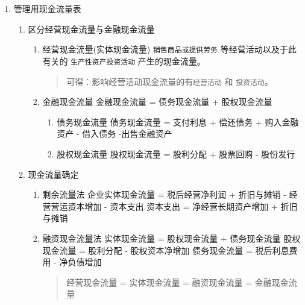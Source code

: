 \documentclass[11pt]{article}
\begin{document}
\begin{enumerate}
\begin{enumerate}
\label{sec:orgdb8c8f3}
利息费用 = -金融损益 = 财务费用 - 金融资产公允价值变动收益 + 金融资产减值损失 - 金融资产投资收益
\item 管理用利润表基本公式
\label{sec:org8545bfc}
$$
净利润=经营损益+金融损益 \\
=税后经营净利润-税后利息税费用\\
=税前经营利润\times (1-所得税税率) - 利息费用\times (1-所得税税率)
$$
传统报表：利润总额-所得税费用
\begin{quote}
无论在管理用报表还是传统报表下，\texttt{净利润的金额都是一样的}。
\end{quote}
\end{enumerate}
\item 管理用现金流量表
\label{sec:org06311e3}
\begin{enumerate}
\item 区分经营现金流量与金融现金流量
\label{sec:org9594591}
\begin{enumerate}
\item 经营现金流量(实体现金流量)
\label{sec:orga970d43}
\texttt{销售商品或提供劳务} 等经营活动以及于此有关的 \texttt{生产性资产投资活动} 产生的现金流量。
\begin{quote}
可得：影响经营活动现金流量的有\texttt{经营活动} 和 \texttt{投资活动}。
\end{quote}
\item 金融现金流量
\label{sec:org2023e2b}
金融现金流量 = 债务现金流量 + 股权现金流量
\begin{enumerate}
\item 债务现金流量
\label{sec:orgfaa83e9}
债务现金流量 = 支付利息 + 偿还债务 + 购入金融资产 - 借入债务 -出售金融资产
\item 股权现金流量
\label{sec:org73881f4}
股权现金流量 = 股利分配 + 股票回购 - 股份发行
\end{enumerate}
\end{enumerate}
\item 现金流量确定
\label{sec:orga2ffe02}
\begin{enumerate}
\item 剩余流量法
\label{sec:orgeeaf114}
企业实体现金流量 = 税后经营净利润 + 折旧与摊销 - 经营营运资本增加 - 资本支出
资本支出 = 净经营长期资产增加 + 折旧与摊销
\item 融资现金流量法
\label{sec:orgeca275f}
实体现金流量 = 股权现金流量 + 债务现金流量
股权现金流量 = 股利分配 - 股权资本净增加
债务现金流量 = 税后利息费用 - 净负债增加
\begin{quote}
经营现金流量 = 实体现金流量 = 融资现金流量 = 金融现金流量
\end{quote}

\end{enumerate}
\end{enumerate}
\end{enumerate}
\end{document}
